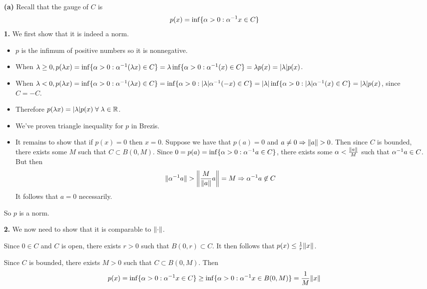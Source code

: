 \documentclass[a4paper, 10pt]{article}
\begin{document}
\begin{solution}
    \textbf{(a)} Recall that the gauge of $C$ is \begin{equation*}
    p(x) = \inf \{\alpha > 0 : \inv{\alpha} x  \in C\}
    \end{equation*}
    \textbf{1.} We first show that it is indeed a norm.
    \begin{itemize}
    \item $p$ is the infimum of positive numbers so it is nonnegative.
    \item When $\lambda \geq 0, p(\lambda x) = \inf \{\alpha > 0 : \inv{\alpha}(\lambda x) \in C\} = \lambda \inf \{\alpha > 0 : \inv{\alpha} (x) \in C\} = \lambda p(x) = \abs{\lambda} p(x)$.
    \item When $\lambda < 0, p(\lambda x) = \inf\{\alpha > 0 : \inv{\alpha} (\lambda x) \in C\} = \inf \{\alpha > 0 : \abs{\lambda}\inv{\alpha}(-x) \in C\}  = \abs{\lambda} \inf \{\alpha > 0 : \abs{\lambda}\inv{\alpha}(x) \in C\} = \abs{\lambda} p(x)$, since $C = -C$.
    \item Therefore $p(\lambda x) = \abs{\lambda} p(x) \forall \lambda \in \bbr$.
    \item We've proven triangle inequality for $p$ in Brezis.
    \item It remains to show that if $p(x) = 0$ then $x = 0$. Suppose we have that $p(a) = 0$ and $a \neq 0 \implies \norm{a} > 0$. Then since $C$ is bounded, there exists some $M$ such that $C \subset B(0, M)$. Since $0 = p(a) = \inf\{\alpha > 0 : \inv{\alpha} a \in C\}$, there exists some $\alpha < \frac{\norm{a}}{M}$ such that $\inv{\alpha}a \in C$. But then \begin{equation*}
    \norm{\inv{\alpha} a} > \norm*{\frac{M}{\norm{a}}a} = M \implies \inv{\alpha}a \not \in C
    \end{equation*}
    It follows that $a = 0$ necessarily.
    \end{itemize}
    
    So $p$ is a norm. 
    
    \textbf{2.} We now need to show that it is comparable to $\norm{\cdot}$. 
    
    Since $0 \in C$ and $C$ is open, there exists $r > 0$ such that $B(0, r) \subset C$. It then follows that $p(x) \leq \frac{1}{r} \norm{x}$.

    Since $C$ is bounded, there exists $M > 0$ such that $C \subset B(0, M)$. Then \begin{equation*}
    p(x) = \inf \{\alpha > 0 : \inv{\alpha}x \in C\} \geq \inf \{\alpha > 0 : \inv{\alpha} x \in B(0, M)\} = \frac{1}{M} \norm{x}   
    \end{equation*}


\end{solution}
\end{document}
